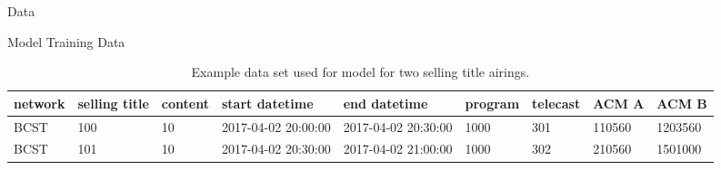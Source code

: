 \begin{chapter}{Data}
\begin{section}{Model Training Data}
  \begin{table}[h!]
    \begin{adjustbox}{width=1.1\textwidth,center=\textwidth}
      \large
      \begin{tabular}{lllllllll}
        network & selling title & content & start datetime & end datetime & program & telecast & ACM A & ACM B\\
        \hline
        BCST & 100 & 10 & 2017-04-02 20:00:00 & 2017-04-02 20:30:00 & 1000 & 301 & 110560 & 1203560\\
        BCST & 101 & 10 & 2017-04-02 20:30:00 & 2017-04-02 21:00:00 & 1000 & 302 & 210560 & 1501000\\
      \end{tabular}
    \end{adjustbox}
    \caption{Example data set used for model for two selling title airings.}\label{tab:data}
  \end{table}


\end{section}

\end{chapter}